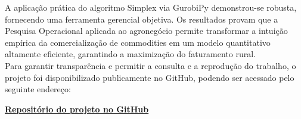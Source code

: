 \documentclass[12pt, a4paper]{article}
\begin{document}
A aplicação prática do algoritmo Simplex via GurobiPy demonstrou-se robusta, fornecendo uma ferramenta gerencial objetiva. Os resultados provam que a Pesquisa Operacional aplicada ao agronegócio permite transformar a intuição empírica da comercialização de commodities em um modelo quantitativo altamente eficiente, garantindo a maximização do faturamento rural.\\[0.03cm]

Para garantir transparência e permitir a consulta e a reprodução do trabalho, o projeto foi disponibilizado publicamente no GitHub, podendo ser acessado pelo seguinte endereço:


\begin{center}
\href{https://github.com/alexferrei198170/Projeto-Pesquisa-Operacional-Otimiza-o-Destina-o-Produ-o-Laranja-}{\textbf{Repositório do projeto no GitHub}}
\end{center}


\newpage
\appendix
\end{document}
